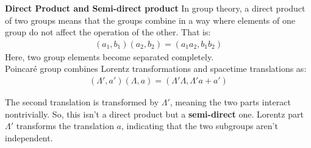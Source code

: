 \documentclass[14pt]{article} %
\begin{document}
 \vspace{0.5cm}
\begin{tcolorbox}[ title=\textbf{Note:}]
\textbf{Direct Product and Semi-direct product}
\newline
In group theory, a direct product of two groups means that the groups combine in a way where elements of one group do not affect the operation of the other. That is:
\begin{align*}
(a_1, b_1)(a_2, b_2) = (a_1 a_2, b_1 b_2)
\end{align*}
Here, two group elements become separated completely.\\
Poincaré group combines Lorentz transformations and spacetime translations as:
\begin{align*}
(\Lambda', a')(\Lambda, a) = (\Lambda'\Lambda, \Lambda'a + a')
\end{align*}

The second translation is transformed by $\Lambda'$, meaning the two parts interact nontrivially. So, this isn't a direct product but a \textbf{semi-direct} one. Lorentz part $\Lambda'$ transforms the translation $a$, indicating that the two subgroups aren't independent.
\end{tcolorbox}
\vspace{-0.7cm}
\end{document}
